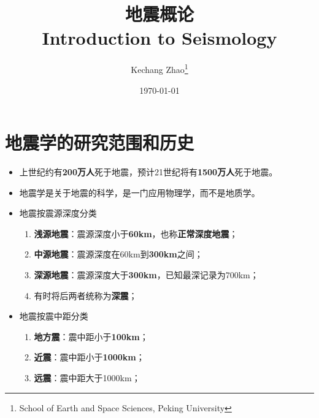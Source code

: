 \documentclass[twoside,titlepage,hyperref,UTF8,12pt]{ctexart}
\title{\linespread{1.5}\Huge\bfseries 地震概论\\\huge\mdseries Introduction to Seismology}
\author{\LARGE Kechang Zhao\thanks{School of Earth and Space Sciences, Peking University}}
\date{\Large\today}
\begin{document}
\maketitle
\tableofcontents
\newpage

\section{地震学的研究范围和历史}
\begin{itemize}
\item 上世纪约有\textbf{200万人}死于地震，预计21世纪将有\textbf{1500万人}死于地震。
\item 地震学是关于地震的科学，是一门应用物理学，而不是地质学。
\item 地震按震源深度分类
    \begin{enumerate}
        \item \textbf{浅源地震}：震源深度小于\textbf{60km}，也称\textbf{正常深度地震}；
        \item \textbf{中源地震}：震源深度在60km到\textbf{300km}之间；
        \item \textbf{深源地震}：震源深度大于\textbf{300km}，已知最深记录为700km；
        \item 有时将后两者统称为\textbf{深震}；
    \end{enumerate}
\item 地震按震中距分类
    \begin{enumerate}
        \item \textbf{地方震}：震中距小于\textbf{100km}；
        \item \textbf{近震}：震中距小于\textbf{1000km}；
        \item \textbf{远震}：震中距大于1000km；
    \end{enumerate}
\end{itemize}
\end{document}
